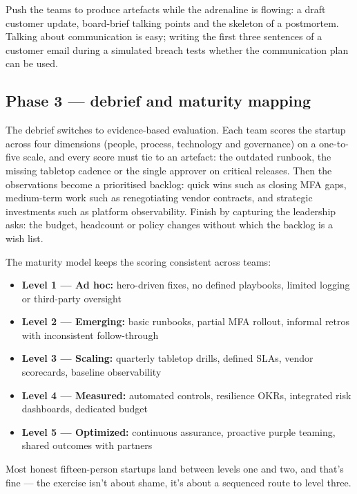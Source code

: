 Push the teams to produce artefacts while the adrenaline is flowing: a draft customer update, board-brief talking points and the skeleton of a postmortem. Talking about communication is easy; writing the first three sentences of a customer email during a simulated breach tests whether the communication plan can be used.



\subsection{Phase 3 — debrief and maturity mapping}


The debrief switches to evidence-based evaluation. Each team scores the startup across four dimensions (people, process, technology and governance) on a one-to-five scale, and every score must tie to an artefact: the outdated runbook, the missing tabletop cadence or the single approver on critical releases. Then the observations become a prioritised backlog: quick wins such as closing MFA gaps, medium-term work such as renegotiating vendor contracts, and strategic investments such as platform observability. Finish by capturing the leadership asks: the budget, headcount or policy changes without which the backlog is a wish list.


The maturity model keeps the scoring consistent across teams:


\begin{itemize}[leftmargin=*]
\item \textbf{Level 1 — Ad hoc:} hero-driven fixes, no defined playbooks, limited logging or third-party oversight
\item \textbf{Level 2 — Emerging:} basic runbooks, partial MFA rollout, informal retros with inconsistent follow-through
\item \textbf{Level 3 — Scaling:} quarterly tabletop drills, defined SLAs, vendor scorecards, baseline observability
\item \textbf{Level 4 — Measured:} automated controls, resilience OKRs, integrated risk dashboards, dedicated budget
\item \textbf{Level 5 — Optimized:} continuous assurance, proactive purple teaming, shared outcomes with partners
\end{itemize}

Most honest fifteen-person startups land between levels one and two, and that's fine — the exercise isn't about shame, it's about a sequenced route to level three.



